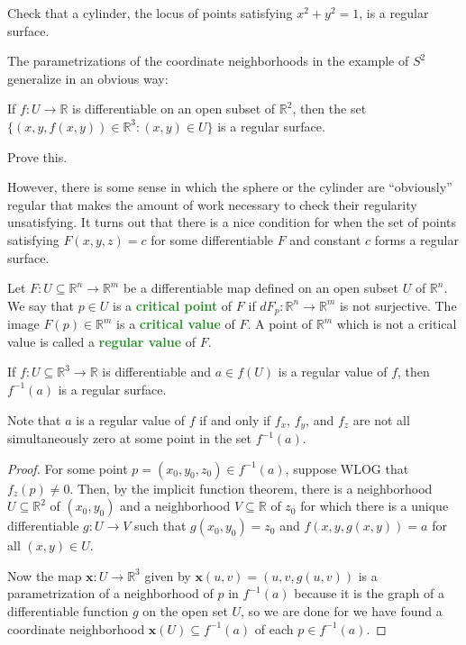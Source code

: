 \documentclass[10pt]{scrartcl}
\providecommand{\RR}{\mathbb R}
\providecommand{\inv}{^{-1}}
\providecommand{\mb}[1]{\mathbf{#1}}
\providecommand{\vocab}[1]{{\textbf{\textcolor{ForestGreen}{#1}}}}
\begin{document}
\begin{exercise}
	Check that a cylinder, the locus of points satisfying $x^2 + y^2 = 1$,
	is a regular surface.
\end{exercise}

The parametrizations of the coordinate neighborhoods in the example of $S^2$
generalize in an obvious way:
\begin{prop}
	If $f\colon U\to \RR$ is differentiable on an open subset of $\RR^2$,
	then the set $\{(x,y,f(x,y))\in\RR^3 : (x,y)\in U\}$
	is a regular surface.
\end{prop}

\begin{exercise}
	Prove this.
\end{exercise}

However, there is some sense in which the sphere or the cylinder
are ``obviously'' regular that makes the amount of work necessary
to check their regularity unsatisfying.
It turns out that there is a nice condition for when
the set of points satisfying $F(x, y, z) = c$ for some
differentiable $F$ and constant $c$ forms a regular surface.

\begin{definition}
	Let $F\colon U\subseteq\RR^n\to\RR^m$ be a differentiable map
	defined on an open subset $U$ of $\RR^n$.
	We say that $p\in U$ is a \vocab{critical point} of $F$
	if $dF_p\colon\RR^n\to\RR^m$ is not surjective.
	The image $F(p)\in\RR^m$ is a \vocab{critical value} of $F$.
	A point of $\RR^m$ which is not a critical value
	is called a \vocab{regular value} of $F$.
\end{definition}

\begin{prop}
	If $f\colon U\subseteq\RR^3\to\RR$ is differentiable
	and $a\in f(U)$ is a regular value of $f$, then $f\inv(a)$
	is a regular surface.
\end{prop}

Note that $a$ is a regular value of $f$ if and only if
$f_x$, $f_y$, and $f_z$ are not all simultaneously zero
at some point in the set $f\inv(a)$.

\begin{proof}[Proof]
	For some point $p=(x_0,y_0,z_0)\in f\inv(a)$,
	suppose WLOG that $f_z(p)\ne 0$.
	Then, by the implicit function theorem, there is a neighborhood
	$U\subseteq\RR^2$ of $(x_0,y_0)$ and a neighborhood $V\subseteq\RR$ of $z_0$
	for which there is a unique differentiable $g\colon U\to V$
	such that $g(x_0,y_0) = z_0$ and $f(x, y, g(x,y)) = a$
	for all $(x,y)\in U$.
	
	Now the map $\mb x\colon U\to\RR^3$
	given by $\mb x(u,v) = (u,v,g(u,v))$ is a parametrization
	of a neighborhood of $p$ in $f\inv(a)$
	because it is the graph of a differentiable function $g$
	on the open set $U$, so we are done
	for we have found a coordinate neighborhood $\mb x(U)\subseteq f\inv(a)$
	of each $p\in f\inv(a)$.
\end{proof}
\end{document}
